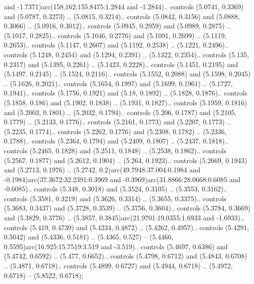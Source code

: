 and -1.7371)arc(158.162:155.8475:1.2844 and -1.2844).. controls (5.0741, 0.3369) and (5.0787, 0.3273) .. (5.0815, 0.3214).. controls (5.0842, 0.3156) and (5.0888, 0.3066) .. (5.0916, 0.3012).. controls (5.0945, 0.2959) and (5.0989, 0.2875) .. (5.1017, 0.2825).. controls (5.1046, 0.2776) and (5.1091, 0.2699) .. (5.1119, 0.2653).. controls (5.1147, 0.2607) and (5.1192, 0.2538) .. (5.1221, 0.2496).. controls (5.1248, 0.2454) and (5.1294, 0.2391) .. (5.1322, 0.2354).. controls (5.135, 0.2317) and (5.1395, 0.2261) .. (5.1423, 0.2228).. controls (5.1451, 0.2195) and (5.1497, 0.2145) .. (5.1524, 0.2116).. controls (5.1552, 0.2088) and (5.1598, 0.2045) .. (5.1626, 0.2021).. controls (5.1654, 0.1997) and (5.1699, 0.1961) .. (5.1727, 0.1941).. controls (5.1756, 0.1921) and (5.18, 0.1892) .. (5.1828, 0.1876).. controls (5.1858, 0.186) and (5.1902, 0.1838) .. (5.1931, 0.1827).. controls (5.1959, 0.1816) and (5.2003, 0.1801) .. (5.2032, 0.1794).. controls (5.206, 0.1787) and (5.2105, 0.1779) .. (5.2133, 0.1776).. controls (5.2161, 0.1773) and (5.2207, 0.1773) .. (5.2235, 0.1774).. controls (5.2262, 0.1776) and (5.2308, 0.1782) .. (5.2336, 0.1788).. controls (5.2364, 0.1794) and (5.2409, 0.1807) .. (5.2437, 0.1818).. controls (5.2465, 0.1828) and (5.2511, 0.1848) .. (5.2538, 0.1862).. controls (5.2567, 0.1877) and (5.2612, 0.1904) .. (5.264, 0.1923).. controls (5.2669, 0.1943) and (5.2713, 0.1976) .. (5.2742, 0.2)arc(49.7948:37.004:0.1984 and -0.1984)arc(37.3672:32.2391:0.3969 and -0.3969)arc(31.8866:28.0668:0.6085 and -0.6085).. controls (5.348, 0.3018) and (5.3524, 0.3105) .. (5.3553, 0.3162).. controls (5.3581, 0.3219) and (5.3626, 0.3314) .. (5.3655, 0.3375).. controls (5.3683, 0.3437) and (5.3728, 0.3539) .. (5.3756, 0.3604).. controls (5.3784, 0.3669) and (5.3829, 0.3776) .. (5.3857, 0.3845)arc(21.9701:19.0355:1.6933 and -1.6933).. controls (5.419, 0.4739) and (5.4234, 0.4872) .. (5.4262, 0.4957).. controls (5.4291, 0.5042) and (5.4336, 0.5181) .. (5.4365, 0.527) -- (5.4466, 0.5595)arc(16.925:15.7519:3.519 and -3.519).. controls (5.4697, 0.6386) and (5.4742, 0.6592) .. (5.477, 0.6652).. controls (5.4798, 0.6712) and (5.4843, 0.6708) .. (5.4871, 0.6718).. controls (5.4899, 0.6727) and (5.4944, 0.6718) .. (5.4972, 0.6718) -- (5.8522, 0.6718);



